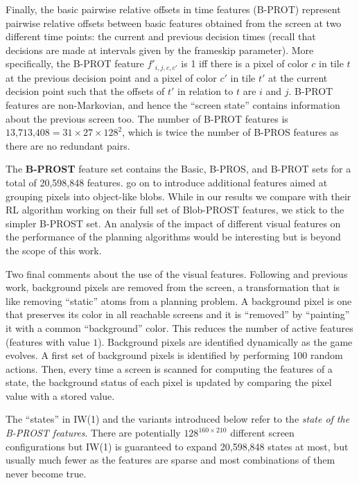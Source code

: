 \documentclass[letterpaper]{article}
\begin{document}
Finally, the basic pairwise relative  offsets in time    features (B-PROT)
represent pairwise relative offsets between basic  features obtained from the screen
at two  different time points: the current and previous decision times (recall that decisions are made at  intervals given by the frameskip parameter).
More specifically,  the B-PROT feature $f'_{i,j,c,c'}$ is 1 iff  there is a  pixel of color $c$ in  tile $t$
at the previous decision point and  a pixel of color $c'$ in tile $t'$ at the current decision point
such that the offsets of $t'$ in relation to $t$  are $i$ and $j$. B-PROT features are non-Markovian,
and hence the ``screen state'' contains information about the previous screen too.
The number of B-PROT features is $\text{13,713,408} = 31\times27\times128^2$, which is twice the number of B-PROS features as there are no redundant pairs.

The \textbf{B-PROST} feature set contains the Basic, B-PROS, and B-PROT sets for a total of
20,598,848 features. \citeauthor{shallow} go on to introduce additional features aimed at grouping pixels
into object-like blobs. While in our results we compare with their RL algorithm working on their
full set of  Blob-PROST features, we stick to the  simpler B-PROST set.
An  analysis of the impact of different visual features  on the performance of the
planning algorithms would be interesting but is beyond the scope of this work.

Two final comments about the use of the visual features. Following
\citeauthor{shallow} and previous work,  background pixels
are removed from the screen, a transformation that is like
removing ``static'' atoms from a planning problem.
A background pixel is one that preserves its color in all
reachable screens and it is ``removed'' by ``painting''
it with a common ``background''  color. This reduces the number
of active features (features with value $1$).
Background pixels are identified dynamically as the game
evolves. A first set of background pixels is identified by
performing 100 random actions. Then, every time a screen is
scanned for computing the features of a state, the background
status of each pixel is updated by comparing the pixel value
with a stored value.

The ``states'' in IW(1) and the variants introduced below refer
to the \emph{state of the B-PROST features}.
There are potentially $128^{160\times210}$ different screen
configurations but IW(1) is guaranteed to expand 20,598,848
states at most, but usually much fewer as the features are
sparse and most combinations of them never become true.
\end{document}
